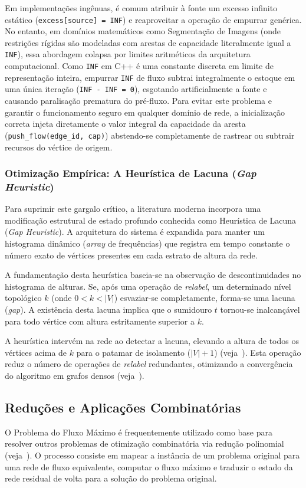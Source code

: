 \documentclass[12pt,a4paper]{article}
\begin{document}
Em implementações ingênuas, é comum atribuir à fonte um excesso infinito estático (\lstinline{excess[source] = INF}) e reaproveitar a operação de empurrar genérica. No entanto, em domínios matemáticos como Segmentação de Imagens (onde restrições rígidas são modeladas com arestas de capacidade literalmente igual a \lstinline{INF}), essa abordagem colapsa por limites aritméticos da arquitetura computacional. Como \lstinline{INF} em C++ é uma constante discreta em limite de representação inteira, empurrar \lstinline{INF} de fluxo subtrai integralmente o estoque em uma única iteração (\lstinline{INF - INF = 0}), esgotando artificialmente a fonte e causando paralisação prematura do pré-fluxo. Para evitar este problema e garantir o funcionamento seguro em qualquer domínio de rede, a inicialização correta injeta diretamente o valor integral da capacidade da aresta (\lstinline{push_flow(edge_id, cap)}) abstendo-se completamente de rastrear ou subtrair recursos do vértice de origem.

\subsubsection{Otimização Empírica: A Heurística de Lacuna (\textit{Gap Heuristic})}

Para suprimir este gargalo crítico, a literatura moderna incorpora uma modificação estrutural de estado profundo conhecida como Heurística de Lacuna (\textit{Gap Heuristic}). A arquitetura do sistema é expandida para manter um histograma dinâmico (\textit{array} de frequências) que registra em tempo constante o número exato de vértices presentes em cada estrato de altura da rede.

A fundamentação desta heurística baseia-se na observação de descontinuidades no histograma de alturas. Se, após uma operação de \textit{relabel}, um determinado nível topológico $k$ (onde $0 < k < |V|$) esvaziar-se completamente, forma-se uma lacuna (\textit{gap}). A existência desta lacuna implica que o sumidouro $t$ tornou-se inalcançável para todo vértice com altura estritamente superior a $k$.

A heurística intervém na rede ao detectar a lacuna, elevando a altura de todos os vértices acima de $k$ para o patamar de isolamento ($|V| + 1$) (veja~\cite{korte2018combinatorial}). Esta operação reduz o número de operações de \textit{relabel} redundantes, otimizando a convergência do algoritmo em grafos densos (veja~\cite{goldberg1988new}).

\subsection{Reduções e Aplicações Combinatórias}
O Problema do Fluxo Máximo é frequentemente utilizado como base para resolver outros problemas de otimização combinatória via redução polinomial (veja~\cite{cook1998combinatorial}). O processo consiste em mapear a instância de um problema original para uma rede de fluxo equivalente, computar o fluxo máximo e traduzir o estado da rede residual de volta para a solução do problema original.
\end{document}

